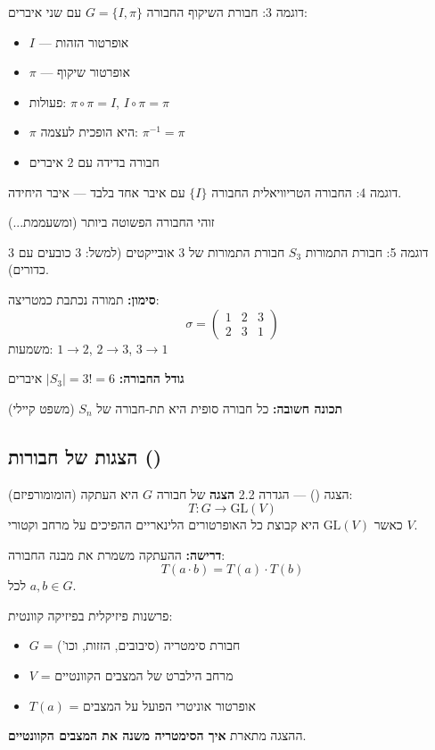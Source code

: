 \begin{examplebox}{דוגמה 3: חבורת השיקוף}
החבורה $G = \{I, \pi\}$ עם שני איברים:
\begin{itemize}
    \item $I$ — אופרטור הזהות
    \item $\pi$ — אופרטור שיקוף
    \item פעולות: $\pi \circ \pi = I$, $I \circ \pi = \pi$
    \item $\pi$ היא הופכית לעצמה: $\pi^{-1} = \pi$
    \item חבורה בדידה עם 2 איברים
\end{itemize}
\end{examplebox}

\begin{examplebox}{דוגמה 4: החבורה הטריוויאלית}
החבורה $\{I\}$ עם איבר אחד בלבד — איבר היחידה.

זוהי החבורה הפשוטה ביותר (ומשעממת...)
\end{examplebox}

\begin{examplebox}{דוגמה 5: חבורת התמורות $S_3$}
חבורת התמורות של 3 אובייקטים (למשל: 3 כובעים עם 3 כדורים).

\textbf{סימון:} תמורה נכתבת כמטריצה:
\[
\sigma = \begin{pmatrix} 1 & 2 & 3 \\ 2 & 3 & 1 \end{pmatrix}
\]
משמעות: $1 \to 2$, $2 \to 3$, $3 \to 1$

\textbf{גודל החבורה:} $|S_3| = 3! = 6$ איברים

\textbf{תכונה חשובה:} כל חבורה סופית היא תת-חבורה של $S_n$ (משפט קיילי)
\end{examplebox}

\subsection{הצגות של חבורות ()}

\begin{definitionbox}{הצגה () — הגדרה 2.2}
\textbf{הצגה} של חבורה $G$ היא העתקה (הומומורפיזם):
\[
T: G \to \text{GL}(V)
\]
כאשר $\text{GL}(V)$ היא קבוצת כל האופרטורים הלינאריים ההפיכים על מרחב וקטורי $V$.

\textbf{דרישה:} ההעתקה משמרת את מבנה החבורה:
\[
T(a \cdot b) = T(a) \cdot T(b)
\]
לכל $a, b \in G$.
\end{definitionbox}

\begin{notebox}{פרשנות פיזיקלית}
בפיזיקה קוונטית:
\begin{itemize}
    \item $G$ = חבורת סימטריה (סיבובים, הזזות, וכו')
    \item $V$ = מרחב הילברט של המצבים הקוונטיים
    \item $T(a)$ = אופרטור אוניטרי הפועל על המצבים
\end{itemize}

ההצגה מתארת \textbf{איך הסימטריה משנה את המצבים הקוונטיים}.
\end{notebox}


